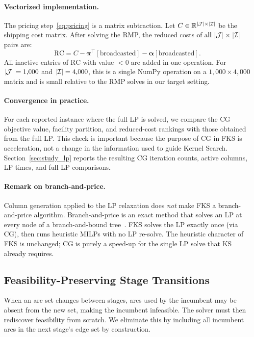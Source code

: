 \paragraph{Vectorized implementation.}
The pricing step~\eqref{eq:pricing} is a matrix subtraction.
Let $C \in \mathbb{R}^{|\mathcal{J}| \times |\mathcal{I}|}$ be the shipping cost matrix.
After solving the RMP, the reduced costs of all $|\mathcal{J}| \times |\mathcal{I}|$ pairs are:
\[
  \mathrm{RC} = C - \boldsymbol{\pi}^{\top}[\text{broadcasted}]
                  - \boldsymbol{\alpha}[\text{broadcasted}].
\]
All inactive entries of $\mathrm{RC}$ with value $< 0$ are added in one
operation.
For $|\mathcal{J}| = 1{,}000$ and $|\mathcal{I}| = 4{,}000$, this is a single NumPy operation on a
$1{,}000 \times 4{,}000$ matrix and is small relative to the RMP solves in our
target setting.

\paragraph{Convergence in practice.}
For each reported instance where the full LP is solved, we compare the CG
objective value, facility partition, and reduced-cost rankings with those
obtained from the full LP.
This check is important because the purpose of CG in FKS is acceleration, not a
change in the information used to guide Kernel Search.
Section~\ref{sec:study_lp} reports the resulting CG iteration counts, active
columns, LP times, and full-LP comparisons.

\paragraph{Remark on branch-and-price.}
Column generation applied to the LP relaxation does \emph{not} make FKS a
branch-and-price algorithm.
Branch-and-price is an exact method that solves an LP at every node of a
branch-and-bound tree~\citep{barnhart1998branch}.
FKS solves the LP exactly once (via CG), then runs heuristic MILPs with no
LP re-solve.
The heuristic character of FKS is unchanged; CG is purely a speed-up for
the single LP solve that KS already requires.

\subsection{Feasibility-Preserving Stage Transitions}
\label{sec:proposition}

When an arc set changes between stages, arcs used by the incumbent may be
absent from the new set, making the incumbent infeasible.
The solver must then rediscover feasibility from scratch.
We eliminate this by including all incumbent arcs in the next stage's edge
set by construction.

